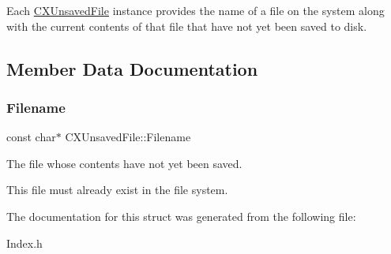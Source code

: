 Each \hyperlink{structCXUnsavedFile}{C\+X\+Unsaved\+File} instance provides the name of a file on the system along with the current contents of that file that have not yet been saved to disk. 

\subsection{Member Data Documentation}
\mbox{\label{structCXUnsavedFile_aa8bf5d4351628ee8502b517421e8b418}} 
\subsubsection{\texorpdfstring{Filename}{Filename}}
{\footnotesize\ttfamily const char$\ast$ C\+X\+Unsaved\+File\+::\+Filename}



The file whose contents have not yet been saved. 

This file must already exist in the file system. 

The documentation for this struct was generated from the following file\+:\begin{DoxyCompactItemize}
\item 
Index.\+h\end{DoxyCompactItemize}

